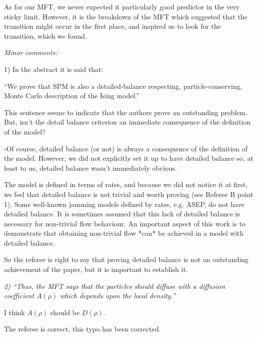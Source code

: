\documentclass[a4paper,10pt]{article}
\begin{document}
  As for our MFT, we never expected it particularly good predictor in the very sticky limit. However, it is the breakdown of the MFT which suggested that the transition might occur in the first place,
  and inspired us to look for the transition, which we found.
 
 
  
{\it    Minor comments:
  
   1) In the abstract it is said that:
  
   ``We prove that SPM is also a detailed-balance respecting,
   particle-conserving, Monte Carlo description of the Ising model.''
  
   This sentence seems to indicate that the authors prove an outstanding problem. But, isn't the detail balance criterion an immediate consequence of the definition of the model? }
 
   -Of course, detailed balance (or not) is always a consequence of the
   definition of the model.  However, we did not explicitly set it up
   to have detailed balance so, at least to us, detailed balance
   wasn't immediately obvious. 
  
   The model is defined in terms of rates, and because we did not
   notice it at first, we feel that detailed balance is not trivial
   and worth proving (see Referee B point 1).  Some well-known jamming
   models defined by rates, e.g. ASEP, do not have detailed balance.
   It is sometimes assumed that this lack of detailed balance is
   necessary for non-trivial flow behaviour.  An important aspect of
   this work is to demonstrate that obtaining non-trivial flow *can*
   be achieved in a model with detailed balance.
 
So the referee is right to say that proving detailed balance is not an
outstanding achievement of the paper, but it is important to establish
it.

{\it 
   2) ``Thus, the MFT says that the particles should diffuse with a diffusion coefficient $A(\rho)$ which depends upon the local density.''
  
  
   I think $A(\rho)$ should be $D(\rho)$.}

The referee is correct, this typo has been corrected.
\end{document}
